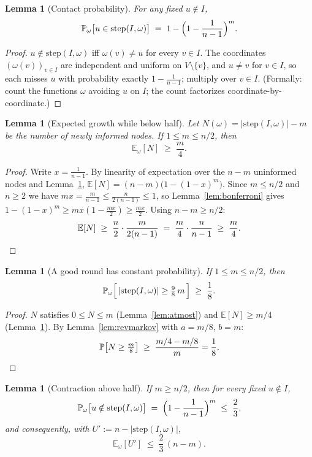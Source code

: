 \documentclass[11pt]{article}
\newtheorem{lemma}[theorem]{Lemma}
\newcommand{\E}{\mathbb{E}}
\renewcommand{\Pr}{\mathbb{P}}
\begin{document}
\begin{lemma}[Contact probability]\label{lem:contact}
For any fixed $u \notin I$,
\[
  \Pr_\omega\bigl[u \in \mathrm{step}(I,\omega)\bigr]
  \;=\; 1 - \Bigl(1-\frac{1}{n-1}\Bigr)^{m}.
\]
\end{lemma}

\begin{proof}
$u \notin \mathrm{step}(I,\omega)$ iff $\omega(v) \ne u$ for every $v \in I$.
The coordinates $(\omega(v))_{v \in I}$ are independent and uniform on
$V \setminus \{v\}$, and $u \ne v$ for $v\in I$, so each misses $u$ with
probability exactly $1 - \frac1{n-1}$; multiply over $v \in I$.
(Formally: count the functions $\omega$ avoiding $u$ on $I$; the count
factorizes coordinate-by-coordinate.)
\end{proof}

\begin{lemma}[Expected growth while below half]\label{lem:expgrowth}
Let $N(\omega) = |\mathrm{step}(I,\omega)| - m$ be the number of newly
informed nodes.  If $1 \le m \le n/2$, then
\[
  \E_\omega[N] \;\ge\; \frac{m}{4}.
\]
\end{lemma}

\begin{proof}
Write $x = \frac1{n-1}$. By linearity of expectation over the $n-m$
uninformed nodes and Lemma~\ref{lem:contact},
$\E[N] = (n-m)\bigl(1-(1-x)^m\bigr)$.
Since $m \le n/2$ and $n \ge 2$ we have
$mx = \frac{m}{n-1} \le \frac{n}{2(n-1)} \le 1$,
so Lemma~\ref{lem:bonferroni} gives
$1-(1-x)^m \ge mx(1-\tfrac{mx}{2}) \ge \tfrac{mx}{2}$.
Using $n - m \ge n/2$:
\[
  \E[N] \;\ge\; \frac{n}{2}\cdot\frac{m}{2(n-1)}
  \;=\; \frac{m}{4}\cdot\frac{n}{n-1} \;\ge\; \frac{m}{4}. \qedhere
\]
\end{proof}

\begin{lemma}[A good round has constant probability]\label{lem:goodround}
If $1 \le m \le n/2$, then
\[
  \Pr_\omega\Bigl[\,|\mathrm{step}(I,\omega)| \ge \tfrac{9}{8}\,m\,\Bigr]
  \;\ge\; \frac18 .
\]
\end{lemma}

\begin{proof}
$N$ satisfies $0 \le N \le m$ (Lemma~\ref{lem:atmost}) and $\E[N] \ge m/4$
(Lemma~\ref{lem:expgrowth}).  By Lemma~\ref{lem:revmarkov} with $a = m/8$,
$b = m$:
\[
  \Pr\bigl[N \ge \tfrac{m}{8}\bigr] \;\ge\; \frac{m/4 - m/8}{m} = \frac18 .
  \qedhere
\]
\end{proof}

\begin{lemma}[Contraction above half]\label{lem:contract}
If $m \ge n/2$, then for every fixed $u \notin I$,
\[
  \Pr_\omega\bigl[u \notin \mathrm{step}(I,\omega)\bigr]
  \;=\; \Bigl(1-\frac1{n-1}\Bigr)^m \;\le\; \frac23 ,
\]
and consequently, with $U' := n - |\mathrm{step}(I,\omega)|$,
\[
  \E_\omega[U'] \;\le\; \frac23\,(n-m).
\]
\end{lemma}
\end{document}

